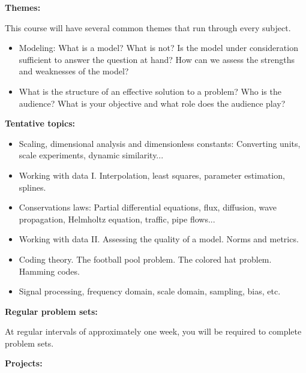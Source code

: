 \documentclass{article}
\begin{document}
\bigskip

 {\bf Themes:}

 This course will have several common themes that run through every
subject.

\begin{itemize}

\item Modeling: What is a model?  What is not?  
Is the model under consideration sufficient to answer the question at
hand?  How can we assess the strengths and weaknesses of the model?

\item What is the structure of an effective solution to a problem?
Who is the audience?  What is your objective and what role does the
audience play?

\end{itemize}

 {\bf Tentative topics:}

\begin{itemize}

\item Scaling, dimensional analysis and dimensionless constants:
Converting units, scale experiments, dynamic similarity...

\item Working with data I.  Interpolation, least squares, parameter
estimation, splines.

\item Conservations laws: Partial differential equations, 
flux, diffusion, wave propagation, 
Helmholtz equation, traffic, pipe flows...

\item Working with data II.  Assessing the quality of a model.  Norms and 
metrics.

\item Coding theory.  The football pool problem.  The colored hat
problem. Hamming codes.

\item Signal processing, frequency domain, scale domain, sampling,
bias, etc.

\end{itemize}

\newpage

 {\bf Regular problem sets:}

 At regular intervals of approximately one week, you will be required
to complete problem sets.

\bigskip

 {\bf Projects: }
\end{document}
